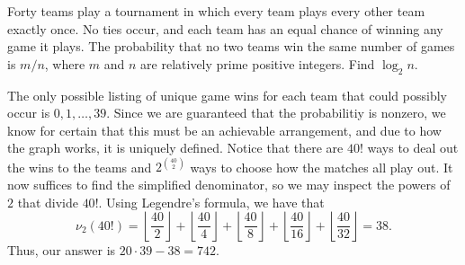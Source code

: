 \documentclass[a4paper, 12pt]{article}
\begin{document}
\setcounter{pnum}{12}

\begin{chirpbox}
    \begin{problemnum}
        Forty teams play a tournament in which every team plays every other team exactly once. No ties occur, and each team has an equal chance of winning any game it plays. The probability that no two teams win the same number of games is \( m/ n \), where \( m \) and \( n \) are relatively prime positive integers. Find \( \log_2 n \).
    \end{problemnum}
\end{chirpbox}

\begin{solution}
    The only possible listing of unique game wins for each team that could possibly occur is \( 0, 1, \dots, 39 \). Since we are guaranteed that the probabilitiy is nonzero, we know for certain that this must be an achievable arrangement, and due to how the graph works, it is uniquely defined. Notice that there are \( 40! \) ways to deal out the wins to the teams and \( 2^{\binom{40}{2}} \) ways to choose how the matches all play out. It now suffices to find the simplified denominator, so we may inspect the powers of \( 2 \) that divide \( 40! \). Using Legendre's formula, we have that
    \[
        \nu_2 (40!) = \left\lfloor \frac{40}{2} \right\rfloor + \left\lfloor \frac{40}{4} \right\rfloor + \left\lfloor \frac{40}{8} \right\rfloor + \left\lfloor \frac{40}{16} \right\rfloor + \left\lfloor \frac{40}{32} \right\rfloor = 38
    .\]
    Thus, our answer is \( 20 \cdot 39 - 38 = \boxed{742} \).
\end{solution}
\end{document}
